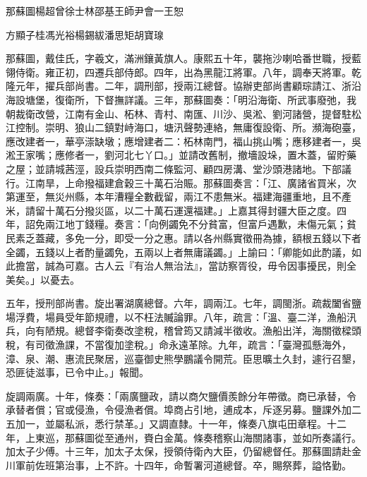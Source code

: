 
\begin{pinyinscope}
那蘇圖楊超曾徐士林邵基王師尹會一王恕

方顯子桂馮光裕楊錫紱潘思矩胡寶瑔

那蘇圖，戴佳氏，字羲文，滿洲鑲黃旗人。康熙五十年，襲拖沙喇哈番世職，授藍翎侍衛。雍正初，四遷兵部侍郎。四年，出為黑龍江將軍。八年，調奉天將軍。乾隆元年，擢兵部尚書。二年，調刑部，授兩江總督。協辦吏部尚書顧琮請江、浙沿海設塘堡，復衛所，下督撫詳議。三年，那蘇圖奏：「明沿海衛、所武事廢弛，我朝裁衛改營，江南有金山、柘林、青村、南匯、川沙、吳淞、劉河諸營，提督駐松江控制。崇明、狼山二鎮對峙海口，塘汛聲勢連絡，無庸復設衛、所。瀕海砲臺，應改建者一，華亭漴缺墩；應增建者二：柘林南門，福山挑山嘴；應移建者一，吳淞王家嘴；應修者一，劉河北七丫口。」並請改舊制，撤墻設垛，置木蓋，留貯藥之屋；並請城茜涇，設兵崇明西南二條監河、顧四房溝、堂沙頭港諸地。下部議行。江南旱，上命撥福建倉穀三十萬石治賑。那蘇圖奏言：「江、廣諸省買米，次第運至，無災州縣，本年漕糧全數截留，兩江不患無米。福建海疆重地，且不產米，請留十萬石分撥災區，以二十萬石運還福建。」上嘉其得封疆大臣之度。四年，詔免兩江地丁錢糧。奏言：「向例蠲免不分貧富，但富戶遇歉，未傷元氣；貧民素乏蓋藏，多免一分，即受一分之惠。請以各州縣實徵冊為據，額根五錢以下者全蠲，五錢以上者酌量蠲免，五兩以上者無庸議蠲。」上諭曰：「卿能如此酌議，如此擔當，誠為可嘉。古人云『有治人無治法』，當訪察胥役，毋令因事擾民，則全美矣。」以憂去。

五年，授刑部尚書。旋出署湖廣總督。六年，調兩江。七年，調閩浙。疏裁闔省鹽場浮費，場員受年節規禮，以不枉法贓論罪。八年，疏言：「溫、臺二洋，漁船汛兵，向有陋規。總督李衛奏改塗稅，稽曾筠又請減半徵收。漁船出洋，海關徵樑頭稅，有司徵漁課，不當復加塗稅。」命永遠革除。九年，疏言：「臺灣孤懸海外，漳、泉、潮、惠流民聚居，巡臺御史熊學鵬議令開荒。臣思曠土久封，遽行召墾，恐匪徒滋事，已令中止。」報聞。

旋調兩廣。十年，條奏：「兩廣鹽政，請以商欠鹽價羨餘分年帶徵。商已承替，令承替者償；官或侵漁，令侵漁者償。埠商占引地，逋成本，斥逐另募。鹽課外加二五加一，並屬私派，悉行禁革。」又調直隸。十一年，條奏八旗屯田章程。十二年，上東巡，那蘇圖從至通州，賚白金萬。條奏稽察山海關諸事，並如所奏議行。加太子少傅。十三年，加太子太保，授領侍衛內大臣，仍留總督任。那蘇圖請赴金川軍前佐班第治事，上不許。十四年，命暫署河道總督。卒，賜祭葬，謚恪勤。


\end{pinyinscope}

